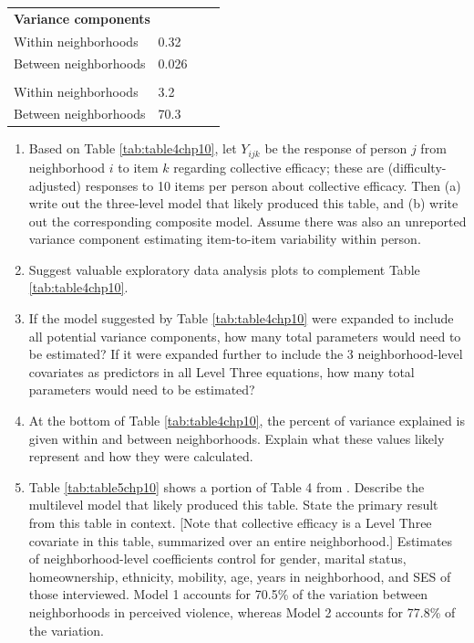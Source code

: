 \documentclass[
]{krantz}
\begin{document}
\begin{table}
{\begin{tabular}[t]{llll}
\multicolumn{4}{l}{\textbf{Variance components}}\\
\hspace{1em}Within neighborhoods & 0.32 &  & \\
\hspace{1em}Between neighborhoods & 0.026 &  & \\
\addlinespace[0.3em]
\multicolumn{4}{l}{\textbf{Percent of variance explained}}\\
\hspace{1em}Within neighborhoods & 3.2 &  & \\
\hspace{1em}Between neighborhoods & 70.3 &  & \\
\bottomrule
\end{tabular}}
\end{table}

\begin{enumerate}
\def\labelenumi{\arabic{enumi}.}
\setcounter{enumi}{17}
\item
  Based on Table \ref{tab:table4chp10}, let \(Y_{ijk}\) be the response of person \(j\) from neighborhood \(i\) to item \(k\) regarding collective efficacy; these are (difficulty-adjusted) responses to 10 items per person about collective efficacy. Then (a) write out the three-level model that likely produced this table, and (b) write out the corresponding composite model. Assume there was also an unreported variance component estimating item-to-item variability within person.
\item
  Suggest valuable exploratory data analysis plots to complement Table \ref{tab:table4chp10}.
\item
  If the model suggested by Table \ref{tab:table4chp10} were expanded to include all potential variance components, how many total parameters would need to be estimated? If it were expanded further to include the 3 neighborhood-level covariates as predictors in all Level Three equations, how many total parameters would need to be estimated?
\item
  At the bottom of Table \ref{tab:table4chp10}, the percent of variance explained is given within and between neighborhoods. Explain what these values likely represent and how they were calculated.
\item
  Table \ref{tab:table5chp10} shows a portion of Table 4 from \citet{Sampson1997}. Describe the multilevel model that likely produced this table. State the primary result from this table in context. {[}Note that collective efficacy is a Level Three covariate in this table, summarized over an entire neighborhood.{]} Estimates of neighborhood-level coefficients control for gender, marital status, homeownership, ethnicity, mobility, age, years in neighborhood, and SES of those interviewed. Model 1 accounts for 70.5\% of the variation between neighborhoods in perceived violence, whereas Model 2 accounts for 77.8\% of the variation.
\end{enumerate}
\end{document}
